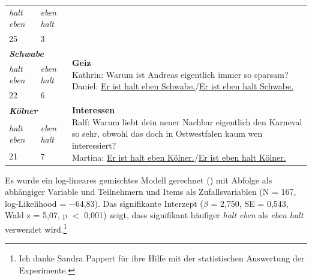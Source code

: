 \begin{exe}
\begin{tabular}[t]{|l|l|p{25em}|}
\cline{1-2}
\emph{halt eben}& \emph{eben halt} & {}\\
\cline{1-2}
25 & 3 & {}\\
\hline
\multicolumn{2}{|l|}{\textbf{\textit{Schwabe}}}& \multirow{3}{25em}{\textbf{Geiz
}\newline Kathrin: Warum ist Andreas eigentlich immer so sparsam? \newline
Daniel: \underline{Er ist halt eben Schwabe.}/\underline{Er ist eben halt Schwabe.}}\\
\cline{1-2}
\emph{halt eben}& \emph{eben halt} & {}\\
\cline{1-2}
22 & 6 & {}\\
\hline
\multicolumn{2}{|l|}{\textbf{\textit{Kölner}}}& \multirow{3}{25em}{\textbf{Interessen
}\newline Ralf: Warum liebt dein neuer Nachbar eigentlich den Karneval so 
sehr, obwohl das doch in Ostwestfalen kaum wen interessiert? \newline	
Martina: \underline{Er ist halt eben Kölner.}/\underline{Er ist eben halt Kölner.}}\\
\cline{1-2}
\emph{halt eben}& \emph{eben halt} & {}\\
\cline{1-2}
21 & 7 & {}\\
\hline
\end{tabular}
\end{exe}
Es wurde ein log-lineares gemischtes Modell gerechnet (\citealt{Baayen2008}) mit Abfolge als abhängiger Variable und Teilnehmern und Items als Zufallsvariablen (N = 167, log-Likelihood = $\minus$64,83). Das signifikante Interzept ($\beta$ = 2,750, SE = 0,543, Wald z = 5,07, p $<$ 0,001) zeigt, dass signifikant häufiger \textit{halt eben} als \textit{eben halt} verwendet wird.\footnote{Ich danke Sandra Pappert für ihre Hilfe mit der statistischen Auswertung der Experimente.}

